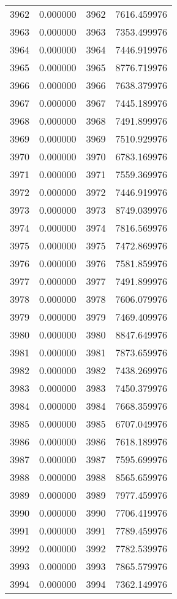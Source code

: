 \documentclass[12pt]{article}
\begin{document}
\begin{longtable}{@{}cccc@{}}
3962 & 0.000000 & 3962 & 7616.459976 \\
3963 & 0.000000 & 3963 & 7353.499976 \\
3964 & 0.000000 & 3964 & 7446.919976 \\
3965 & 0.000000 & 3965 & 8776.719976 \\
3966 & 0.000000 & 3966 & 7638.379976 \\
3967 & 0.000000 & 3967 & 7445.189976 \\
3968 & 0.000000 & 3968 & 7491.899976 \\
3969 & 0.000000 & 3969 & 7510.929976 \\
3970 & 0.000000 & 3970 & 6783.169976 \\
3971 & 0.000000 & 3971 & 7559.369976 \\
3972 & 0.000000 & 3972 & 7446.919976 \\
3973 & 0.000000 & 3973 & 8749.039976 \\
3974 & 0.000000 & 3974 & 7816.569976 \\
3975 & 0.000000 & 3975 & 7472.869976 \\
3976 & 0.000000 & 3976 & 7581.859976 \\
3977 & 0.000000 & 3977 & 7491.899976 \\
3978 & 0.000000 & 3978 & 7606.079976 \\
3979 & 0.000000 & 3979 & 7469.409976 \\
3980 & 0.000000 & 3980 & 8847.649976 \\
3981 & 0.000000 & 3981 & 7873.659976 \\
3982 & 0.000000 & 3982 & 7438.269976 \\
3983 & 0.000000 & 3983 & 7450.379976 \\
3984 & 0.000000 & 3984 & 7668.359976 \\
3985 & 0.000000 & 3985 & 6707.049976 \\
3986 & 0.000000 & 3986 & 7618.189976 \\
3987 & 0.000000 & 3987 & 7595.699976 \\
3988 & 0.000000 & 3988 & 8565.659976 \\
3989 & 0.000000 & 3989 & 7977.459976 \\
3990 & 0.000000 & 3990 & 7706.419976 \\
3991 & 0.000000 & 3991 & 7789.459976 \\
3992 & 0.000000 & 3992 & 7782.539976 \\
3993 & 0.000000 & 3993 & 7865.579976 \\
3994 & 0.000000 & 3994 & 7362.149976 \\

\end{longtable}
\end{document}
